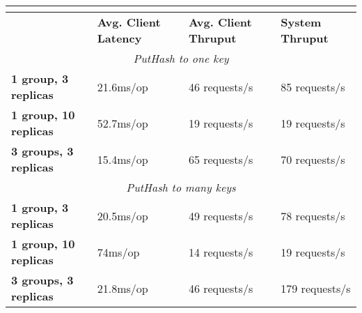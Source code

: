 \documentclass[letterpaper,10pt]{article}
\begin{document}
\begin{table}[h]
\begin{tabular}{|l|l|l|l|}
\hline
\multicolumn{4}{|c|}{\cellcolor[HTML]{C0C0C0}{\color[HTML]{000000} \textbf{Vanilla Paxos}}}                              \\ \hline
                              & \textbf{Avg. Client Latency} & \textbf{Avg. Client Thruput} & \textbf{System Thruput} \\ \hline
\multicolumn{4}{|c|}{\textit{PutHash to one key}}                                                                     \\ \hline
\textbf{1 group, 3 replicas}  & 21.6ms/op                    & 46 requests/s                & 85 requests/s           \\ \hline
\textbf{1 group, 10 replicas} & 52.7ms/op                    & 19 requests/s                & 19 requests/s           \\ \hline
\textbf{3 groups, 3 replicas} & 15.4ms/op                    & 65 requests/s                & 70 requests/s           \\ \hline
\multicolumn{4}{|c|}{\textit{PutHash to many keys}}                                                                 \\ \hline
\textbf{1 group, 3 replicas}  & 20.5ms/op                    & 49 requests/s                & 78 requests/s           \\ \hline
\textbf{1 group, 10 replicas} & 74ms/op                      & 14 requests/s                & 19 requests/s           \\ \hline
\textbf{3 groups, 3 replicas} & 21.8ms/op                    & 46 requests/s                & 179 requests/s          \\ \hline
\end{tabular}
\end{table}

\end{document}
